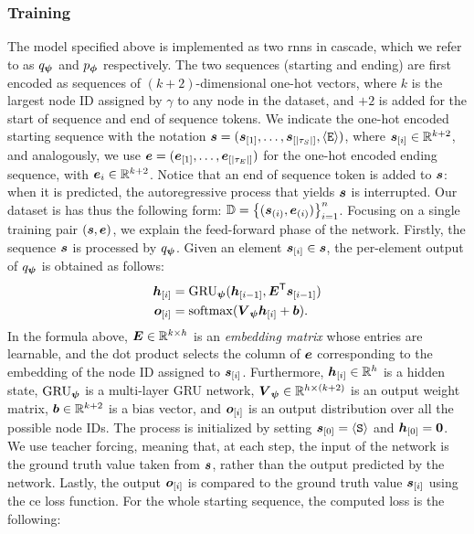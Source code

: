 \subsubsection*{Training}
The model specified above is implemented as two \glspl{rnn} in cascade, which we refer to as $q_{\boldsymbol{\psi}}$ and $p_{\boldsymbol{\phi}}$ respectively. The two sequences (starting and ending) are first encoded as sequences of $(k+2)$-dimensional one-hot vectors, where $k$ is the largest node ID assigned by $\gamma$ to any node in the dataset, and $+2$ is added for the start of sequence and end of sequence tokens. We indicate the one-hot encoded starting sequence with the notation $\Vector{s} = (\Elem{s}{1}, \ldots, \Elem{s}{|\tau_S|}, \EOS)$, where $\Elem{s}{i} \in \Real^{k+2}$, and analogously, we use $\Vector{e} = (\Elem{e}{1}, \ldots, \Elem{e}{|\tau_E|})$ for the one-hot encoded ending sequence, with $\Vector{e}_i \in \Real^{k+2}$. Notice that an end of sequence token is added to $\Vector{s}$: when it is predicted, the autoregressive process that yields $\Vector{s}$ is interrupted. Our dataset is has thus the following form: $\Data = \Set{(\Vector{s}_{(i)}, \Vector{e}_{(i)})}_{i=1}^n$. Focusing on a single training pair $(\Vector{s}, \Vector{e})$, we explain the feed-forward phase of the network. Firstly, the sequence $\Vector{s}$ is processed by $q_{\boldsymbol{\psi}}$. Given an element $\Elem{s}{i} \in \Vector{s}$, the per-element output of $q_{\boldsymbol{\psi}}$ is obtained as follows:
\begin{align*}
    \Elem{h}{i} &= \Op{GRU}_{\EncParam}(\Elem{h}{i-1}, \Matrix{E}^{\Transpose}\Elem{s}{i-1})\\
    \Elem{o}{i} &= \softmax(\Matrix{V}_{\EncParam}\Elem{h}{i} + \Vector{b}).
\end{align*}
In the formula above, $\Matrix{E} \in \Real^{k \times h}$ is an \emph{embedding matrix} whose entries are learnable, and the dot product selects the column of $\Vector{E}$ corresponding to the embedding of the node ID assigned to $\Elem{s}{i}$. Furthermore, $\Elem{h}{i} \in \Real^h$ is a hidden state, $\operatorname{GRU}_{\boldsymbol{\psi}}$ is a multi-layer GRU network, $\Matrix{V}_{\EncParam} \in \Real^{h \times (k+2)}$ is an output weight matrix,  $\Vector{b} \in \Real^{k+2}$ is a bias vector, and $\Elem{o}{i}$ is an output distribution over all the possible node IDs. The process is initialized by setting $\Elem{s}{0} = \SOS$ and $\Elem{h}{0} = \Zeros$. We use teacher forcing, meaning that, at each step, the input of the network is the ground truth value taken from $\Vector{s}$, rather than the output predicted by the network. Lastly, the output $\Elem{o}{i}$ is compared to the ground truth value $\Elem{s}{i}$ using the \gls{ce} loss function. For the whole starting sequence, the computed loss is the following:
